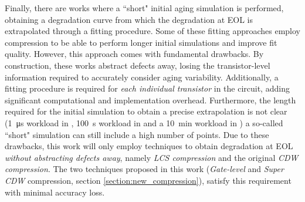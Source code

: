 
Finally, there are works \cite{gholveCARATReliabilityAnalysis2023,vansantenBTIHCDDegradation2020,gensslerModelingPredictingTransistor2023, amrouchConnectingPhysicalApplication2015, duchAnalysisFunctionalErrors2020} where a ``short" initial aging simulation is performed, obtaining a degradation curve from which the degradation at EOL is extrapolated through a fitting procedure. Some of these fitting approaches employ compression \cite{amrouchConnectingPhysicalApplication2015, duchAnalysisFunctionalErrors2020} to be able to perform longer initial simulations and improve fit quality. However, this approach comes with fundamental drawbacks. By construction, these works abstract defects away, losing the transistor-level information required to accurately consider aging variability. Additionally, a fitting procedure is required for \textit{each individual transistor} in the circuit, adding significant computational and implementation overhead. Furthermore, the length required for the initial simulation to obtain a precise extrapolation is not clear (\qty{1}{\micro s} workload in \cite{gholveCARATReliabilityAnalysis2023,vansantenBTIHCDDegradation2020,gensslerModelingPredictingTransistor2023}, \qty{100}{s} workload in \cite{amrouchConnectingPhysicalApplication2015} and a \qty{10}{min} workload in \cite{duchAnalysisFunctionalErrors2020}) a so-called ``short" simulation can still include a high number of points. Due to these drawbacks, this work will only employ techniques to obtain degradation at EOL \textit{without abstracting defects away}, namely \textit{LCS compression} and the original \textit{CDW compression}. The two techniques proposed in this work (\textit{Gate-level} and \textit{Super CDW} compression, section \ref{section:new_compression}), satisfy this requirement with minimal accuracy loss. 


